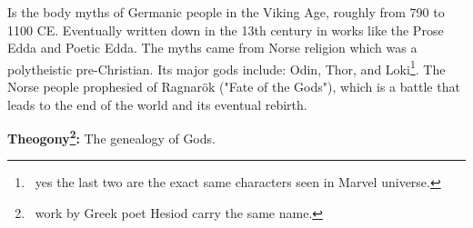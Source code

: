 \documentclass[12pt, a4paper]{article}
\begin{document}

Is the body myths of Germanic people in the Viking Age, roughly from 790 to 1100 CE.
Eventually written down in the 13th century in works like the Prose Edda and Poetic Edda.
The myths came from Norse religion which was a polytheistic pre-Christian. Its major gods
include: Odin, Thor, and Loki\footnote{\, yes the last two are the exact same characters seen in Marvel universe.}. 
The Norse people prophesied of Ragnarök ("Fate of the Gods"), which is a battle that leads to the
end of the world and its eventual rebirth.\medbreak

\textbf{Theogony\footnote{\, work by Greek poet Hesiod carry the same name.}:} The genealogy of Gods.
  
\end{document}
